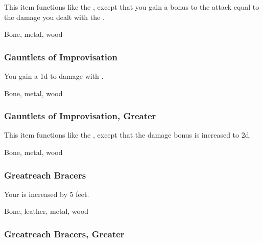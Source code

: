 This item functions like the , except that you gain a bonus to the  attack equal to the damage you dealt with the .



 Bone, metal, wood


\lowercase{\hypertarget{item:Gauntlets of Improvisation}{}}\label{item:Gauntlets of Improvisation}
\hypertarget{item:Gauntlets of Improvisation}{\subsubsection{Gauntlets of Improvisation\hfill{}}}

You gain a \plus1d  to damage with .



 Bone, metal, wood


\lowercase{\hypertarget{item:Gauntlets of Improvisation, Greater}{}}\label{item:Gauntlets of Improvisation, Greater}
\hypertarget{item:Gauntlets of Improvisation, Greater}{\subsubsection{Gauntlets of Improvisation, Greater\hfill{}}}

This item functions like the , except that the damage bonus is increased to \plus2d.



 Bone, metal, wood


\lowercase{\hypertarget{item:Greatreach Bracers}{}}\label{item:Greatreach Bracers}
\hypertarget{item:Greatreach Bracers}{\subsubsection{Greatreach Bracers\hfill{}}}

Your  is increased by 5 feet.



 Bone, leather, metal, wood


\lowercase{\hypertarget{item:Greatreach Bracers, Greater}{}}\label{item:Greatreach Bracers, Greater}
\hypertarget{item:Greatreach Bracers, Greater}{\subsubsection{Greatreach Bracers, Greater\hfill{}}}

